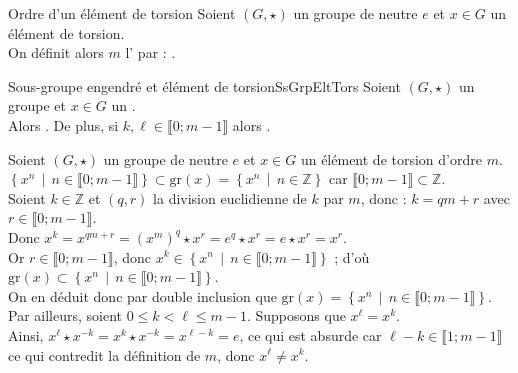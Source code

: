 \documentclass[12pt,a4paper]{report}
\begin{document}
    \begin{definition}{Ordre d'un élément de torsion}{}
    Soient $(G, \star)$ un groupe de neutre $e$ et $x \in G$ un élément de torsion.\\
    On définit alors $m$ l' par : . 
    \end{definition}
    
    \begin{proposition}{Sous-groupe engendré et élément de torsion}{SsGrpEltTors}
    Soient $(G, \star)$ un groupe et $x \in G$ un .\\
    Alors . De plus, si $k, \ell \in \llbracket 0 ; m - 1 \rrbracket$ alors .
    \end{proposition}
    
    \begin{demo}[Démonstrations]
    Soient  $(G, \star)$ un groupe de neutre $e$ et $x \in G$ un élément de torsion d'ordre $m$.\\
    $ \left\{ x^n \,\middle|\, n \in \llbracket 0 ; m - 1 \rrbracket \right\} \subset \text{gr}(x) = \left\lbrace x^n \,\middle|\, n \in \mathbb{Z} \right\rbrace $ car $\llbracket 0 ; m - 1 \rrbracket \subset \mathbb{Z} $.\\
    Soient $k \in \mathbb{Z}$ et $(q, r)$ la division euclidienne de $k$ par $m$, donc : $k = qm + r$ avec $r \in \llbracket 0 ; m - 1 \rrbracket$.\\
    Donc $x^k = x^{qm + r} = (x^m)^q \star x^r = e^q \star x^r = e \star x^r = x^r$.\\
    Or $r \in \llbracket 0 ; m - 1 \rrbracket$, donc $x^k \in \left\{ x^n \,\middle|\, n \in \llbracket 0 ; m - 1 \rrbracket \right\}$ ; d'où $\text{gr}(x) \subset \left\{ x^n \,\middle|\, n \in \llbracket 0 ; m - 1 \rrbracket \right\}$.\\
    On en déduit donc par double inclusion que $\text{gr}(x) =  \left\{ x^n \,\middle|\, n \in \llbracket 0 ; m - 1 \rrbracket \right\}$.\\
    Par ailleurs, soient $0 \leqslant k < \ell \leqslant m-1$. Supposons que $x^\ell = x^k$.\\
    Ainsi, $x^\ell \star x^{-k} = x^k \star x^{-k} = x^{\ell - k} = e$, ce qui est absurde car $\ell - k \in \llbracket 1 ; m - 1 \rrbracket$ ce qui contredit la définition de $m$, donc $x^\ell \neq x^k$.
    \end{demo}
    
\end{document}
